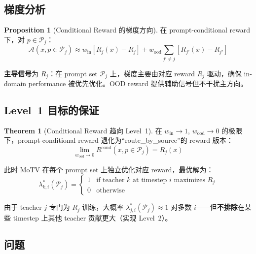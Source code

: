 \documentclass[11pt,a4paper]{article}
\newcommand{\adv}{\mathcal{A}}
\newcommand{\reward}{R}
\theoremstyle{definition}
\newtheorem{proposition}{Proposition}
\newtheorem{theorem}{Theorem}
\begin{document}
\subsection{梯度分析}

\begin{proposition}[Conditional Reward 的梯度方向]
在 prompt-conditional reward 下，对 $p \in \mathcal{P}_j$：
\begin{equation}
\adv(x, p \in \mathcal{P}_j) \approx w_{\mathrm{in}}\left[R_j(x) - \bar{R}_j\right] + w_{\mathrm{ood}}\sum_{j' \neq j}\left[R_{j'}(x) - \bar{R}_{j'}\right]
\end{equation}

\textbf{主导信号}为 $R_j$：在 prompt set $\mathcal{P}_j$ 上，梯度主要由对应 reward $R_j$ 驱动，确保 in-domain performance 被优先优化。OOD reward 提供辅助信号但不干扰主方向。
\end{proposition}

\subsection{Level~1 目标的保证}

\begin{theorem}[Conditional Reward 趋向 Level~1]
\label{thm:level1}
在 $w_{\mathrm{in}} \to 1$, $w_{\mathrm{ood}} \to 0$ 的极限下，prompt-conditional reward 退化为``route\_by\_source''的 reward 版本：
\begin{equation}
\lim_{w_{\mathrm{ood}} \to 0} \reward^{\mathrm{cond}}(x, p \in \mathcal{P}_j) = R_j(x)
\end{equation}

此时 MoTV 在每个 prompt set 上独立优化对应 reward，最优解为：
\begin{equation}
\lambda^*_{k,i}(\mathcal{P}_j) = \begin{cases} 1 & \text{if teacher $k$ at timestep $i$ maximizes $R_j$} \\ 0 & \text{otherwise} \end{cases}
\end{equation}

由于 teacher $j$ 专门为 $R_j$ 训练，大概率 $\lambda^*_{j,i}(\mathcal{P}_j) \approx 1$ 对多数 $i$——但\textbf{不排除}在某些 timestep 上其他 teacher 贡献更大（实现 Level~2）。
\end{theorem}

\subsection{问题}
\end{document}
